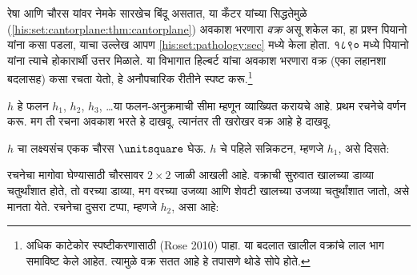 रेषा आणि चौरस यांवर नेमके सारखेच बिंदू असतात, या कँटर यांच्या सिद्धतेमुळे (\ref{his:set:cantorplane:thm:cantorplane}) अवकाश भरणारा \emph{वक्र} असू शकेल का, हा प्रश्न पियानो यांना कसा पडला, याचा उल्लेख आपण \ref{his:set:pathology:sec} मध्ये केला होता. १८९० मध्ये पियानो यांना त्याचे होकारार्थी उत्तर मिळाले. या विभागात हिल्बर्ट यांचा अवकाश भरणारा वक्र (एका लहानशा बदलासह) कसा रचता येतो, हे अनौपचारिक रीतीने स्पष्ट करू.\footnote{अधिक काटेकोर स्पष्टीकरणासाठी (Rose 2010) पाहा. या बदलात खालील वक्रांचे लाल भाग समाविष्ट केले आहेत. त्यामुळे वक्र सतत आहे हे तपासणे थोडे सोपे होते.}

$h$ हे फलन $h_1$, $h_2$, $h_3$, \dots\@ या फलन-अनुक्रमाची सीमा म्हणून व्याख्यित करायचे आहे. प्रथम रचनेचे वर्णन करू. मग ती रचना अवकाश भरते हे दाखवू. त्यानंतर ती खरोखर वक्र आहे हे दाखवू.

$h$ चा लक्ष्यसंच एकक चौरस $\unitsquare$ घेऊ. $h$ चे पहिले सन्निकटन, म्हणजे $h_1$, असे दिसते:
\begin{center}
\end{center}
रचनेचा मागोवा घेण्यासाठी चौरसावर $2 \times 2$ जाळी आखली आहे. वक्राची सुरुवात खालच्या डाव्या चतुर्थांशात होते, तो वरच्या डाव्या, मग वरच्या उजव्या आणि शेवटी खालच्या उजव्या चतुर्थांशात जातो, असे मानता येते. रचनेचा दुसरा टप्पा, म्हणजे $h_2$, असा आहे:
